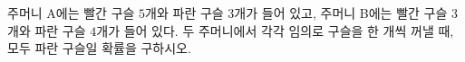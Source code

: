 주머니 A에는 빨간 구슬 $5$개와 파란 구슬 $3$개가 들어 있고, 주머니 B에는 빨간 구슬 $3$개와 파란 구슬 $4$개가 들어 있다. 두 주머니에서 각각 임의로 구슬을 한 개씩 꺼낼 때, 모두 파란 구슬일 확률을 구하시오.
